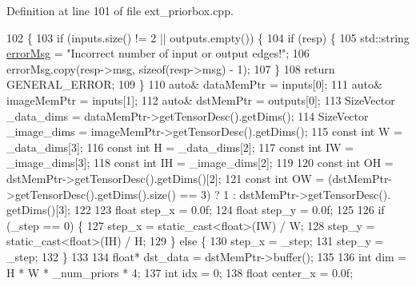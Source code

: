 Definition at line 101 of file ext\+\_\+priorbox.\+cpp.


\begin{DoxyCode}
102                                                              \{
103         \textcolor{keywordflow}{if} (inputs.size() != 2 || outputs.empty()) \{
104             \textcolor{keywordflow}{if} (resp) \{
105                 std::string \hyperlink{classInferenceEngine_1_1Extensions_1_1Cpu_1_1ExtLayerBase_abc78e9b5a79fa339ffd831a5318f71f7}{errorMsg} = \textcolor{stringliteral}{"Incorrect number of input or output edges!"};
106                 errorMsg.copy(resp->msg, \textcolor{keyword}{sizeof}(resp->msg) - 1);
107             \}
108             \textcolor{keywordflow}{return} GENERAL\_ERROR;
109         \}
110         \textcolor{keyword}{auto}& dataMemPtr = inputs[0];
111         \textcolor{keyword}{auto}& imageMemPtr = inputs[1];
112         \textcolor{keyword}{auto}& dstMemPtr = outputs[0];
113         SizeVector \_data\_dims = dataMemPtr->getTensorDesc().getDims();
114         SizeVector \_image\_dims = imageMemPtr->getTensorDesc().getDims();
115         \textcolor{keyword}{const} \textcolor{keywordtype}{int} W = \_data\_dims[3];
116         \textcolor{keyword}{const} \textcolor{keywordtype}{int} H = \_data\_dims[2];
117         \textcolor{keyword}{const} \textcolor{keywordtype}{int} IW = \_image\_dims[3];
118         \textcolor{keyword}{const} \textcolor{keywordtype}{int} IH = \_image\_dims[2];
119 
120         \textcolor{keyword}{const} \textcolor{keywordtype}{int} OH = dstMemPtr->getTensorDesc().getDims()[2];
121         \textcolor{keyword}{const} \textcolor{keywordtype}{int} OW = (dstMemPtr->getTensorDesc().getDims().size() == 3) ? 1 : dstMemPtr->getTensorDesc().
      getDims()[3];
122 
123         \textcolor{keywordtype}{float} step\_x = 0.0f;
124         \textcolor{keywordtype}{float} step\_y = 0.0f;
125 
126         \textcolor{keywordflow}{if} (\_step == 0) \{
127             step\_x = \textcolor{keyword}{static\_cast<}\textcolor{keywordtype}{float}\textcolor{keyword}{>}(IW) / W;
128             step\_y = \textcolor{keyword}{static\_cast<}\textcolor{keywordtype}{float}\textcolor{keyword}{>}(IH) / H;
129         \} \textcolor{keywordflow}{else} \{
130             step\_x = \_step;
131             step\_y = \_step;
132         \}
133 
134         \textcolor{keywordtype}{float}* dst\_data = dstMemPtr->buffer();
135 
136         \textcolor{keywordtype}{int} dim = H * W * \_num\_priors * 4;
137         \textcolor{keywordtype}{int} idx = 0;
138         \textcolor{keywordtype}{float} center\_x = 0.0f;

\end{DoxyCode}

